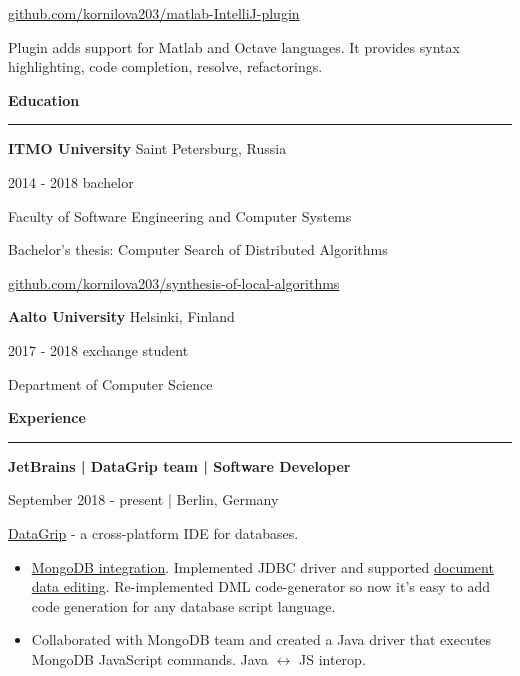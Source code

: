 \documentclass[9pt]{article}
\begin{document}
\begin{multicols}{2}
\href{https://github.com/kornilova203/matlab-IntelliJ-plugin}{github.com/kornilova203/matlab-IntelliJ-plugin}

\vspace{0.3em}

Plugin adds support for Matlab and Octave languages. It provides syntax highlighting, code completion, resolve, refactorings.

\vspace{2em}
{\textbf{Education}}
\vspace{0.5em}
\hrule
\vspace{1em}

{\textbf{ITMO University}} \color{gray} Saint Petersburg, Russia \color{black}

\color{gray} 2014 - 2018 bachelor \color{black}
\vspace{0.3em}

Faculty of Software Engineering and Computer Systems

Bachelor’s thesis: Computer Search of Distributed Algorithms

\href{https://github.com/kornilova203/synthesis-of-local-algorithms}{github.com/kornilova203/synthesis-of-local-algorithms}


\vspace{2em}

{\textbf{Aalto University}} \color{gray} Helsinki, Finland \color{black}

\color{gray} 2017 - 2018 exchange student \color{black}
\vspace{0.3em}

Department of Computer Science


\columnbreak

\vspace{0.5em}

{\textbf{Experience}}

\vspace{0.5em}

\hrule

\vspace{1em}

{\textbf{JetBrains | DataGrip team | Software Developer}}

\color{gray} September 2018 - present | Berlin, Germany \color{black}

\vspace{0.3em}

\href{https://www.jetbrains.com/datagrip/}{DataGrip} - a cross-platform IDE for databases.

\begin{itemize}
\item \href{https://www.jetbrains.com/datagrip/whatsnew/2019-3/#version-2019-3-mongodb-support}{MongoDB integration}. Implemented JDBC driver and supported \href{https://www.jetbrains.com/datagrip/whatsnew/2021-1/#version-2021-1-data-editor}{document data editing}. Re-implemented DML code-generator so now it’s easy to add code generation for any database script language.
\item Collaborated with MongoDB team and created a Java driver that executes MongoDB JavaScript commands. Java \(\leftrightarrow\) JS interop.


\end{itemize}
\end{multicols}
\end{document}

